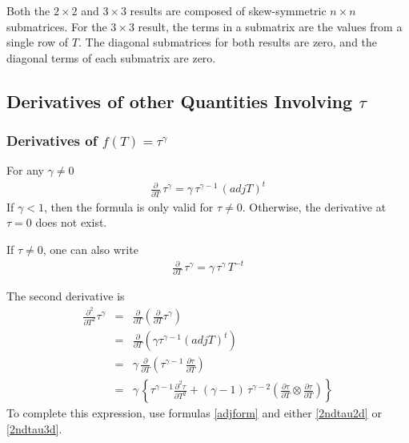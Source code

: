 \documentclass{report}
\begin{document}
\noindent Both the $2 \times 2$ and $3 \times 3$ results are composed of skew-symmetric $n \times n$ submatrices.  For the $3 \times 3$ result, the terms in a submatrix are the values from a single row of $T$.  The diagonal submatrices for both results are zero, and the diagonal terms of each submatrix are zero.

\subsection{Derivatives of other Quantities Involving $\tau$}

\subsubsection{Derivatives of $f(T)=\tau^\gamma$ \label{taugamma}}

For any $\gamma \neq 0$ 
\begin{eqnarray}
\frac{\partial}{\partial T} \, \tau^\gamma = \gamma \, \tau^{\gamma-1} \, (adj T)^t
\end{eqnarray}
If $\gamma<1$, then the formula is only valid for $\tau \neq 0$. 
Otherwise, the derivative at $\tau=0$ does not exist. \newline

\noindent If $\tau \neq 0$, one can also write
\begin{eqnarray}
\frac{\partial}{\partial T} \, \tau^\gamma = \gamma \, \tau^{\gamma} \, T^{-t}
\end{eqnarray}

\noindent The second derivative is
\begin{eqnarray}
\frac{\partial^2}{\partial T^2} \tau^\gamma & = & \frac{\partial}{\partial T} \left( \frac{\partial}{\partial T} \tau^\gamma \right) \nonumber \\
 & = &  \frac{\partial}{\partial T} \left( \gamma \tau^{\gamma-1} (adj T)^t \right) \nonumber \\
 & = & \gamma \,  \frac{\partial}{\partial T} \left( \tau^{\gamma-1} \, \frac{\partial \tau}{\partial T} \right) \nonumber \\
 & = & \gamma \, \left\{ \tau^{\gamma-1} \frac{\partial^2 \tau}{\partial T^2} + (\gamma-1) \, \tau^{\gamma-2} \left( \frac{\partial \tau}{\partial T} \otimes \frac{\partial \tau}{\partial T} \right) \right\}
\end{eqnarray}
To complete this expression, use formulas \ref{adjform} and either 
\ref{2ndtau2d} or \ref{2ndtau3d}. \newline
\end{document}
